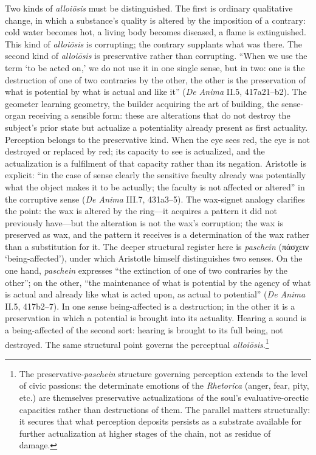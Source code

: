 \documentclass{article}
\newcommand{\gk}[1]{{\greekfont #1}}
\begin{document}
Two kinds of \textit{alloiōsis} must be distinguished. The first is ordinary qualitative change, in which a substance's quality is altered by the imposition of a contrary: cold water becomes hot, a living body becomes diseased, a flame is extinguished. This kind of \textit{alloiōsis} is corrupting; the contrary supplants what was there. The second kind of \textit{alloiōsis} is preservative rather than corrupting. ``When we use the term `to be acted on,' we do not use it in one single sense, but in two: one is the destruction of one of two contraries by the other, the other is the preservation of what is potential by what is actual and like it'' (\textit{De Anima} II.5, 417a21--b2). The geometer learning geometry, the builder acquiring the art of building, the sense-organ receiving a sensible form: these are alterations that do not destroy the subject's prior state but actualize a potentiality already present as first actuality. Perception belongs to the preservative kind. When the eye sees red, the eye is not destroyed or replaced by red; its capacity to see is actualized, and the actualization is a fulfilment of that capacity rather than its negation. Aristotle is explicit: ``in the case of sense clearly the sensitive faculty already was potentially what the object makes it to be actually; the faculty is not affected or altered'' in the corruptive sense (\textit{De Anima} III.7, 431a3--5). The wax-signet analogy clarifies the point: the wax is altered by the ring---it acquires a pattern it did not previously have---but the alteration is not the wax's corruption; the wax is preserved as wax, and the pattern it receives is a determination of the wax rather than a substitution for it. The deeper structural register here is \textit{paschein} (\gk{πάσχειν} `being-affected'), under which Aristotle himself distinguishes two senses. On the one hand, \textit{paschein} expresses ``the extinction of one of two contraries by the other''; on the other, ``the maintenance of what is potential by the agency of what is actual and already like what is acted upon, as actual to potential'' (\textit{De Anima} II.5, 417b2--7). In one sense being-affected is a destruction; in the other it is a preservation in which a potential is brought into its actuality. Hearing a sound is a being-affected of the second sort: hearing is brought to its full being, not destroyed. The same structural point governs the perceptual \textit{alloiōsis}.\footnote{The preservative-\textit{paschein} structure governing perception extends to the level of civic passions: the determinate emotions of the \textit{Rhetorica} (anger, fear, pity, etc.) are themselves preservative actualizations of the soul's evaluative-orectic capacities rather than destructions of them. The parallel matters structurally: it secures that what perception deposits persists as a substrate available for further actualization at higher stages of the chain, not as residue of damage.}
\end{document}
